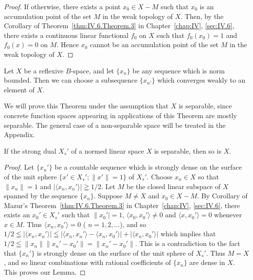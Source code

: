 \begin{proof}
 If otherwise, there exists a point $x_{0} \in X - M$ such that $x_{0}$ is an accumulation point of the set $M$ in the weak topology of $X$. Then, by the Corollary of Theorem~\ref{thm:IV.6.Theorem.3} in Chapter~\ref{chap:IV}, \ref{sec:IV.6}, there exists a continuous linear functional $f_{0}$ on $X$ such that $f_{0}(x_{0}) = 1$ and $f_{0}(x) = 0$ on $M$. Hence $x_{0}$ cannot be an accumulation point of the set $M$ in the weak topology of $X$. 
\end{proof}


\label{sec:V.2}

\begin{theorem}\label{thm:V.2.Theorem.1} Let $X$ be a reflexive $B$-space, and let $\{x_{n}\}$ be any sequence which is norm bounded. Then we can choose a subsequence $\{x_{n'}\}$ which converges weakly to an element of $X$. 
\end{theorem}

We will prove this Theorem under the assumption that $X$ is separable, since concrete function spaces appearing in applications of this Theorem are mostly separable. The general case of a non-separable space will be treated in the Appendix. 

\begin{lemmau} If the strong dual $X_s'$ of a normed linear space $X$ is separable, then so is $X$. 
\end{lemmau}

\begin{proof}
 Let $\{x_n'\}$ be a countable sequence which is strongly dense on the surface of the unit sphere $\{x' \in X_s'; \|x'\| = 1\}$ of $X_s'$. Choose $x_n \in X$ so that $\|x_n\| = 1$ and $|\langle x_n, x_n' \rangle| \geqq 1/2$. Let $M$ be the closed linear subspace of $X$ spanned by the sequence $\{x_n\}$. Suppose $M \neq X$ and $x_0 \in X - M$. By Corollary of Mazur's Theorem~\ref{thm:IV.6.Theorem.3} in Chapter~\ref{chap:IV}, \ref{sec:IV.6}, there exists an $x_0' \in X_s'$ such that $\|x_0'| = 1$, $\langle x_0, x_0' \rangle \neq 0$ and $\langle x, x_0' \rangle = 0$ whenever $x \in M$. Thus $\langle x_n, x_0' \rangle = 0$ ( $n = 1, 2, \ldots$), and so $1/2 \leqq |\langle x_n, x_n' \rangle| \leqq |\langle x_n, x_n' \rangle - \langle x_n, x_0' \rangle| + |\langle x_n, x_0' \rangle|$ which implies that $1/2 \leqq \|x_n\| \|x_n' - x_0'\| = \|x_n' - x_0'\|$. This is a contradiction to the fact that $\{x_n'\}$ is strongly dense on the surface of the unit sphere of $X_s'$. Thus $M = X$, and so linear combinations with rational coefficients of $\{x_n\}$ are dense in $X$. This proves our Lemma. 
\end{proof}

